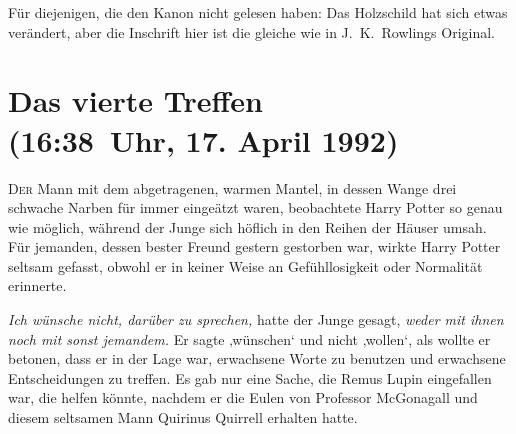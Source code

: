 
\begin{chapterOpeningAuthorNote}
Für diejenigen, die den Kanon nicht gelesen haben: Das Holzschild hat sich etwas verändert, aber die Inschrift hier ist die gleiche wie in J.~K.~Rowlings Original.
\end{chapterOpeningAuthorNote}

\section{Das vierte Treffen\\
(16:38~Uhr, 17. April 1992)}

\lettrine{D}{er} Mann mit dem abgetragenen, warmen Mantel, in dessen Wange drei schwache Narben für immer eingeätzt waren, beobachtete Harry Potter so genau wie möglich, während der Junge sich höflich in den Reihen der Häuser umsah. Für jemanden, dessen bester Freund gestern gestorben war, wirkte Harry Potter seltsam gefasst, obwohl er in keiner Weise an Gefühllosigkeit oder Normalität erinnerte.

\emph{Ich wünsche nicht, darüber zu sprechen,} hatte der Junge gesagt, \emph{weder mit ihnen noch mit sonst jemandem.} Er sagte ‚wünschen‘ und nicht ‚wollen‘, als wollte er betonen, dass er in der Lage war, erwachsene Worte zu benutzen und erwachsene Entscheidungen zu treffen. Es gab nur eine Sache, die Remus Lupin eingefallen war, die helfen könnte, nachdem er die Eulen von Professor McGonagall und diesem seltsamen Mann Quirinus Quirrell erhalten hatte.

